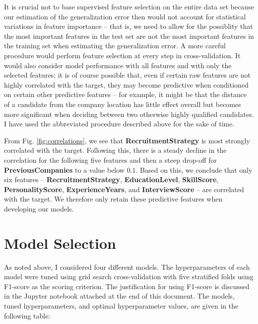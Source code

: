 \documentclass[12pt]{article}
\begin{document}
It is crucial not to base supervised feature selection on the entire data set because our estimation of the generalization error then would not account for statistical variations in feature importance -- that is, we need to allow for the possiblity that the most important features in the test set are not the most important features in the training set when estimating the generalization error. A more careful procedure would perform feature selection at every step in cross-validation. It would also consider model performance with all features and with only the selected features; it is of course possible that, even if certain raw features are not highly correlated with the target, they may become predictive when conditioned on certain other predictive features -- for example, it might be that the distance of a candidate from the company location has little effect overall but becomes more significant when deciding between two otherwise highly qualified candidates. I have used the abbreviated procedure described above for the sake of time.

From Fig. \ref{fig:correlations}, we see that {\bf RecruitmentStrategy} is most strongly correlated with the target. Following this, there is a steady decline in the correlation for the following five features and then a steep drop-off for {\bf PreviousCompanies} to a value below $0.1$. Based on this, we conclude that only six features -- {\bf RecruitmentStrategy}, {\bf EducationLevel}, {\bf SkillScore}, {\bf PersonalityScore}, {\bf ExperienceYears}, and {\bf InterviewScore} -- are correlated with the target. We therefore only retain these predictive features when developing our models.

\section{Model Selection}

As noted above, I considered four different models. The hyperparameters of each model were tuned using grid search cross-validation with five stratified folds using F1-score as the scoring criterion. The justification for using F1-score is discussed in the Jupyter notebook attached at the end of this document. The models, tuned hyperparameters, and optimal hyperparameter values, are given in the following table:
\end{document}
